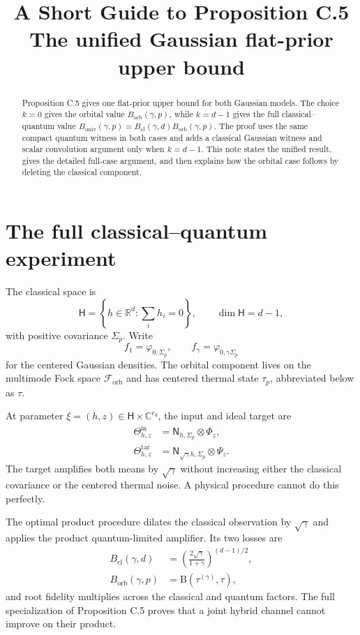 \documentclass[11pt]{article}
\title{A Short Guide to Proposition C.5\\
\large The unified Gaussian flat-prior upper bound}
\author{}
\date{}
\newcommand{\Hc}{\mathsf H}
\newcommand{\F}{\mathcal F_{\mathrm{orb}}}
\newcommand{\B}{\mathrm B}
\newcommand{\Bcl}{B_{\mathrm{cl}}}
\newcommand{\Borb}{B_{\mathrm{orb}}}
\newcommand{\Buniv}{B_{\mathrm{univ}}}
\begin{document}
\maketitle

\begin{abstract}
Proposition C.5 gives one flat-prior upper bound for both Gaussian models.
The choice $k=0$ gives the orbital value $\Borb(\gamma,p)$, while
$k=d-1$ gives the full classical--quantum value
$\Buniv(\gamma,p)=\Bcl(\gamma,d)\Borb(\gamma,p)$.  The proof uses the same
compact quantum witness in both cases and adds a classical Gaussian witness
and scalar convolution argument only when $k=d-1$.  This note states the
unified result, gives the detailed full-case argument, and then explains how
the orbital case follows by deleting the classical component.
\end{abstract}

\section{The full classical--quantum experiment}

The classical space is
\[
  \Hc=\left\{h\in\mathbb R^d:\sum_i h_i=0\right\},
  \qquad \dim\Hc=d-1,
\]
with positive covariance $\Sigma_p$.  Write
\[
  f_1=\varphi_{0,\Sigma_p},
  \qquad
  f_\gamma=\varphi_{0,\gamma\Sigma_p}
\]
for the centered Gaussian densities.  The orbital component lives on the
multimode Fock space $\F$ and has centered thermal state $\tau_p$, abbreviated
below as $\tau$.

At parameter $\xi=(h,z)\in\Hc\times\mathbb C^{r_d}$, the input and ideal
target are
\begin{align*}
  \Theta_{h,z}^{\mathrm{in}}
  &=\mathsf N_{h,\Sigma_p}\otimes\Phi_z,\\
  \Theta_{h,z}^{\mathrm{tar}}
  &=\mathsf N_{\sqrt\gamma h,\Sigma_p}\otimes\Psi_z.
\end{align*}
The target amplifies both means by $\sqrt\gamma$ without increasing either
the classical covariance or the centered thermal noise.  A physical
procedure cannot do this perfectly.

The optimal product procedure dilates the classical observation by
$\sqrt\gamma$ and applies the product quantum-limited amplifier.  Its two
losses are
\begin{align}
  \Bcl(\gamma,d)
  &=\left(\frac{2\sqrt\gamma}{1+\gamma}\right)^{(d-1)/2},
  \label{eq:Bcl}\\
  \Borb(\gamma,p)
  &=\B(\tau^{(\gamma)},\tau),
  \label{eq:Borb}
\end{align}
and root fidelity multiplies across the classical and quantum factors.
The full specialization of Proposition C.5 proves that a joint hybrid channel
cannot improve on their product.
\end{document}
